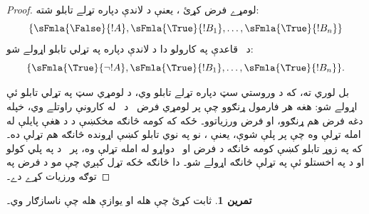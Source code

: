 \documentclass[12pt,a4paper,oneside]{report}
\gdef\pspart{#2}\gdef\pschapter{#3}\gdef\pssection{}%
\newcommand{\ollabel}[1]{\label{\pspart:\pschapter:\pssection:#1}}
\newtheorem{prop}[thm]{قضيه}
\theoremstyle{definition}
\newtheorem{prob}[thm]{تمرين}
\begin{document}
\label{olpseg:OLP-0106-B010:start}
\begin{proof}
لومړے فرض کړئ ، يعنې د لاندې دپاره تړلے
تابلو شته:
\[
\{\sFmla{\False}{!A},
\sFmla{\True}{!B_1}, \dots, \sFmla{\True}{!B_n}\}
\]
د~\LR{$\TRule{\True}{\lnot}$} قاعدې په کارولو دا د لاندې دپاره په تړلي
تابلو اړولے شو:
\[
\{\sFmla{\True}{\lnot !A},
\sFmla{\True}{!B_1}, \dots, \sFmla{\True}{!B_n}\}.
\]
\label{olpseg:OLP-0106-B010:end}

\label{olpseg:OLP-0106-B011:start}
بل لوري ته، که د وروستي سټ دپاره تړلے تابلو وي، د لومړي سټ
په تړلي تابلو ئې اړولے شو: هغه هر فارمول ړنګوو چې پر لومړي
فرض~ د~\TRule{\True}{\lnot} له کارونې
راوتلے وي، خپله دغه فرض هم ړنګوو، او فرض
 ورزياتوو۔ ځکه که کومه څانګه مخکښې د
\TRule{\True}{\lnot} د هغې پايلې له امله تړلې وه چې پر
 پلې شوې، يعنې
، نو په نوي تابلو کښې اړونده څانګه هم
تړلې ده۔ که په زوړ تابلو کښې کومه څانګه د فرض
 او~ دواړو له
امله تړلې وه، پر~ د
\LR{$\TRule{\False}{\lnot}$} په پلي کولو او د
 په اخستلو ئې په تړلې څانګه اړولے شو۔ دا څانګه
ځکه تړل کېږي چې  مو د فرض په توګه ورزيات کړے
دے۔
\end{proof}
\label{olpseg:OLP-0106-B011:end}

\label{olpseg:OLP-0106-B012:start}
\begin{prob}
ثابت کړئ چې  هله او يوازې هله چې
 ناسازګار وي۔
\end{prob}
\label{olpseg:OLP-0106-B012:end}

\label{olpseg:OLP-0106-B013:start}
\label{olpseg:OLP-0106-B013:end}
\end{document}
